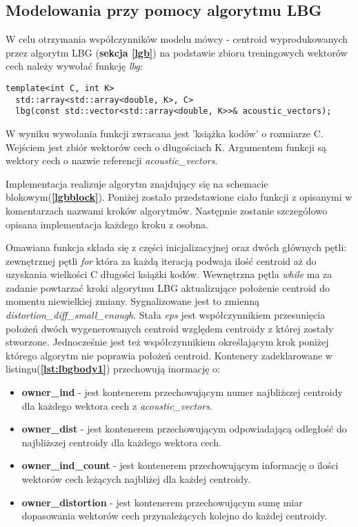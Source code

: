 \subsection{Modelowania przy pomocy algorytmu LBG}

W celu otrzymania współczynników modelu mówcy - centroid wyprodukowanych przez algorytm LBG (\textbf{sekcja \ref{lgb}}) na podstawie zbioru treningowych wektorów cech należy wywołać funkcję \textit{lbg}:

\begin{lstlisting}[style=lst:cpp, caption=Deklaracja funkcji \textit{lbg}\label{lst:lbg}]
  template<int C, int K>
  std::array<std::array<double, K>, C>
  lbg(const std::vector<std::array<double, K>>& acoustic_vectors);
\end{lstlisting}

W wyniku wywołania funkcji zwracana jest 'książka kodów' o rozmiarze C. Wejściem jest zbiór wektorów cech o długościach K. Argumentem funkcji są wektory cech o nazwie referencji \textit{acoustic\_vectors}.

Implementacja realizuje algorytm znajdujący się na schemacie blokowym(\textbf{\ref{lgbblock}}). Poniżej zostało przedstawione ciało funkcji z opisanymi w komentarzach nazwami kroków algorytmów. Następnie zostanie szczegółowo opisana implementacja każdego kroku z osobna. 

Omawiana funkcja składa się z części inicjalizacyjnej oraz dwóch głównych pętli: zewnętrznej pętli \textit{for} która za każdą iteracją podwaja ilość centroid aż do uzyskania wielkości C długości książki kodów. Wewnętrzna pętla \textit{while} ma za zadanie powtarzać kroki algorytmu LBG aktualizujące położenie centroid do momentu niewielkiej zmiany. Sygnalizowane jest to zmienną \textit{distortion\_diff\_small\_enough}. Stała \textit{eps} jest współczynnikiem przesunięcia położeń dwóch wygenerowanych centroid względem centroidy z której zostały stworzone. Jednocześnie jest też współczynnikiem określającym krok poniżej którego algorytm nie poprawia położeń centroid. Kontenery zadeklarowane w listingu(\textbf{\ref{lst:lbgbody1}}) przechowują inormację o:
\begin{itemize}
\item{\textbf{owner\_ind}} - jest kontenerem przechowującym numer najbliższej centroidy dla każdego wektora cech z \textit{acoustic\_vectors}.
\item{\textbf{owner\_dist}} - jest kontenerem przechowującym odpowiadającą odległość do najbliższej centroidy dla każdego wektora cech.
\item{\textbf{owner\_ind\_count}} - jest kontenerem przechowującym informację o ilości wektorów cech leżących najbliżej dla każdej centroidy.
\item{\textbf{owner\_distortion}} - jest kontenerem przechowującym sumę miar dopasowania wektorów cech przynależących kolejno do każdej centroidy.
\end{itemize}


